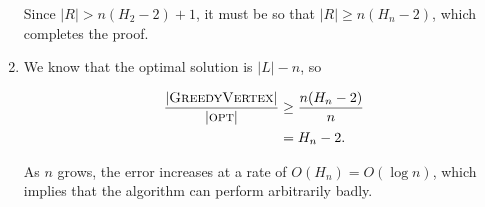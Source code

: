 \documentclass{article}
\begin{document}
\begin{solution}
\begin{enumerate}[label = (\alph*)]
Since $|R| > n(H_2 -2) + 1$, it must be so that $|R| \geq n(H_n - 2)$, which completes the proof.
    
    \item We know that the optimal solution is $|L| - n$, so 

\begin{align*}
	\frac{\lvert \mathsf{\textsc{GreedyVertex}} \rvert}{\lvert \mathsf{\textsc{opt}} \rvert}  &\geq \dfrac{n(H_n - 2)}{n}\\
&= H_n - 2.
\end{align*}

As $n$ grows, the error increases at a rate of $O(H_n) = O(\log n)$, which implies that the algorithm can perform arbitrarily badly.
\end{enumerate}
\end{solution}
\end{document}
